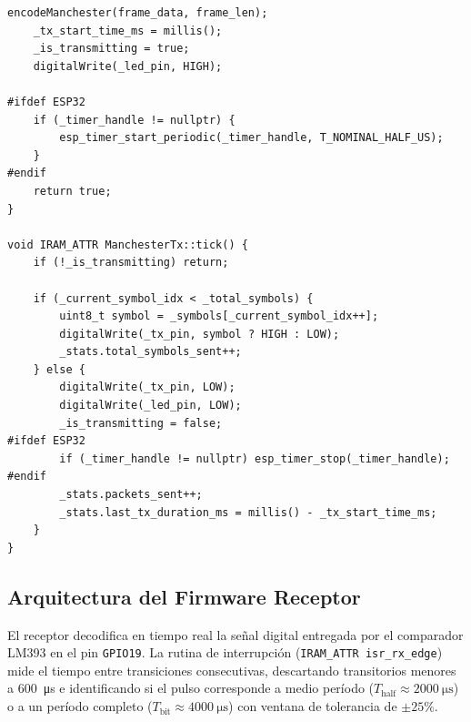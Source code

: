 \begin{lstlisting}[style=customcpp, caption={Codificador Manchester y temporizador de hardware (\texttt{firmware\_tx/manchester\_tx.cpp})}]
    encodeManchester(frame_data, frame_len);
    _tx_start_time_ms = millis();
    _is_transmitting = true;
    digitalWrite(_led_pin, HIGH);

#ifdef ESP32
    if (_timer_handle != nullptr) {
        esp_timer_start_periodic(_timer_handle, T_NOMINAL_HALF_US);
    }
#endif
    return true;
}

void IRAM_ATTR ManchesterTx::tick() {
    if (!_is_transmitting) return;

    if (_current_symbol_idx < _total_symbols) {
        uint8_t symbol = _symbols[_current_symbol_idx++];
        digitalWrite(_tx_pin, symbol ? HIGH : LOW);
        _stats.total_symbols_sent++;
    } else {
        digitalWrite(_tx_pin, LOW);
        digitalWrite(_led_pin, LOW);
        _is_transmitting = false;
#ifdef ESP32
        if (_timer_handle != nullptr) esp_timer_stop(_timer_handle);
#endif
        _stats.packets_sent++;
        _stats.last_tx_duration_ms = millis() - _tx_start_time_ms;
    }
}
\end{lstlisting}

\subsection{Arquitectura del Firmware Receptor}

El receptor decodifica en tiempo real la señal digital entregada por el comparador LM393 en el pin \texttt{GPIO19}. La rutina de interrupción (\texttt{IRAM\_ATTR isr\_rx\_edge}) mide el tiempo entre transiciones consecutivas, descartando transitorios menores a \SI{600}{\micro\second} e identificando si el pulso corresponde a medio período ($T_{\text{half}} \approx \SI{2000}{\micro\second}$) o a un período completo ($T_{\text{bit}} \approx \SI{4000}{\micro\second}$) con ventana de tolerancia de $\pm 25\%$.

